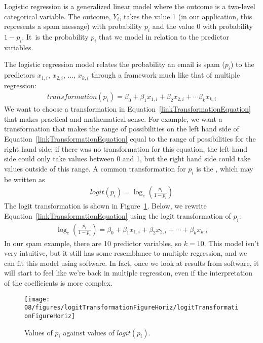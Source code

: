 Logistic regression is a generalized linear model where the outcome is a two-level categorical variable. The outcome, $Y_i$, takes the value 1 (in our application, this represents a spam message) with probability $p_i$ and the value 0 with probability $1-p_i$. It~is the probability $p_i$ that we model in relation to the predictor variables.

The logistic regression model relates the probability an email is spam ($p_i$) to the predictors $x_{1,i}$, $x_{2,i}$, ..., $x_{k,i}$ through a framework much like that of multiple regression:
\begin{align}
transformation(p_{i}) = \beta_0 + \beta_1x_{1,i} + \beta_2 x_{2,i} + \cdots \beta_k x_{k,i}
\label{linkTransformationEquation}
\end{align}
We want to choose a transformation in Equation~\eqref{linkTransformationEquation} that makes practical and mathematical sense. For example, we want a transformation that makes the range of possibilities on the left hand side of Equation~\eqref{linkTransformationEquation} equal to the range of possibilities for the right hand side; if there was no transformation for this equation, the left hand side could only take values between 0 and 1, but the right hand side could take values outside of this range. A common transformation for $p_i$ is the , which may be written as
\begin{align*}
logit(p_i) = \log_{e}\left( \frac{p_i}{1-p_i} \right)
\end{align*}
The logit transformation is shown in Figure~\ref{logitTransformationFigureHoriz}. Below, we rewrite Equation~\eqref{linkTransformationEquation} using the logit transformation of $p_i$:
\begin{align*}
\log_{e}\left( \frac{p_i}{1-p_i} \right)
	= \beta_0 + \beta_1 x_{1,i} + \beta_2 x_{2,i} + \cdots + \beta_k x_{k,i}
\end{align*}
In our spam example, there are 10 predictor variables, so $k = 10$. This model isn't very intuitive, but it still has some resemblance to multiple regression, and we can fit this model using software. In fact, once we look at results from software, it will start to feel like we're back in multiple regression, even if the interpretation of the coefficients is more complex.

\begin{figure}
\centering
\texttt{[image: 08/figures/logitTransformationFigureHoriz/logitTransformationFigureHoriz]}
\caption{Values of $p_i$ against values of $logit(p_i)$.}
\label{logitTransformationFigureHoriz}
\end{figure}

